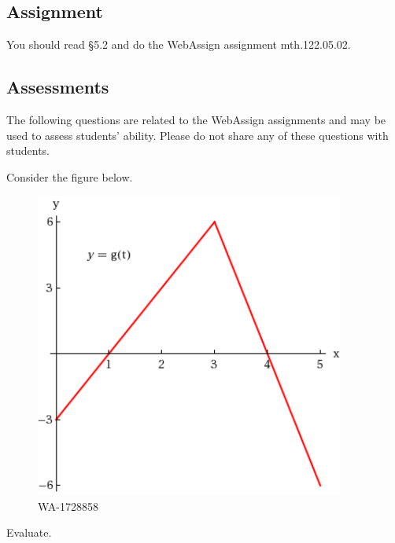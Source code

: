 \documentclass[12pt,addpoints, answers, fleqn]{exam}
\begin{document}
\subsection{Assignment}
You should read \S  5.2 and do the WebAssign assignment mth.122.05.02.
\vfill
\pagebreak


\begin{teacher}
\subsection{Assessments}
The following questions are related to the WebAssign assignments and may be used to assess students' ability. Please do not share any of these questions with students.
\begin{questions}

\question 	%

Consider the figure below.
\begin{figure}[htbp] %
   \centering
   \includegraphics[width=4in]{./graphics/1728858.pdf} 
   \caption{WA-1728858}
   \label{fig:1728858}
\end{figure}
Evaluate.
\end{questions}
\end{teacher}
\end{document}
